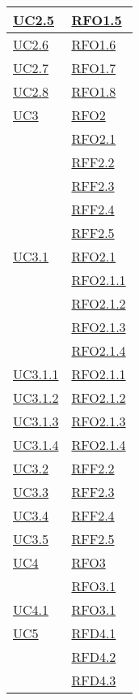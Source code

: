 \begin{longtable}{|>{\centering}m{5cm}|m{5cm}<{\centering}|}
\hyperref[UC2.5]{UC2.5} & \hyperlink{RFO1.5}{RFO1.5}\\ \hline
\hyperref[UC2.6]{UC2.6} & \hyperlink{RFO1.6}{RFO1.6}\\ \hline
\hyperref[UC2.7]{UC2.7} & \hyperlink{RFO1.7}{RFO1.7}\\ \hline
\hyperref[UC2.8]{UC2.8} & \hyperlink{RFO1.8}{RFO1.8}\\ \hline
\hyperref[UC3]{UC3} & \hyperlink{RFO2}{RFO2}\\
& \hyperlink{RFO2.1}{RFO2.1}\\
& \hyperlink{RFF2.2}{RFF2.2}\\
& \hyperlink{RFF2.3}{RFF2.3}\\
& \hyperlink{RFF2.4}{RFF2.4}\\
& \hyperlink{RFF2.5}{RFF2.5}\\ \hline
\hyperref[UC3.1]{UC3.1} & \hyperlink{RFO2.1}{RFO2.1}\\
& \hyperlink{RFO2.1.1}{RFO2.1.1}\\
& \hyperlink{RFO2.1.2}{RFO2.1.2}\\
& \hyperlink{RFO2.1.3}{RFO2.1.3}\\
& \hyperlink{RFO2.1.4}{RFO2.1.4}\\ \hline
\hyperref[UC3.1.1]{UC3.1.1} & \hyperlink{RFO2.1.1}{RFO2.1.1}\\ \hline
\hyperref[UC3.1.2]{UC3.1.2} & \hyperlink{RFO2.1.2}{RFO2.1.2}\\ \hline
\hyperref[UC3.1.3]{UC3.1.3} & \hyperlink{RFO2.1.3}{RFO2.1.3}\\ \hline
\hyperref[UC3.1.4]{UC3.1.4} & \hyperlink{RFO2.1.4}{RFO2.1.4}\\ \hline
\hyperref[UC3.2]{UC3.2} & \hyperlink{RFF2.2}{RFF2.2}\\ \hline
\hyperref[UC3.3]{UC3.3} & \hyperlink{RFF2.3}{RFF2.3}\\ \hline
\hyperref[UC3.4]{UC3.4} & \hyperlink{RFF2.4}{RFF2.4}\\ \hline
\hyperref[UC3.5]{UC3.5} & \hyperlink{RFF2.5}{RFF2.5}\\ \hline
\hyperref[UC4]{UC4} & \hyperlink{RFO3}{RFO3}\\
& \hyperlink{RFO3.1}{RFO3.1}\\ \hline
\hyperref[UC4.1]{UC4.1} & \hyperlink{RFO3.1}{RFO3.1}\\ \hline
\hyperref[UC5]{UC5} & \hyperlink{RFD4.1}{RFD4.1}\\
& \hyperlink{RFD4.2}{RFD4.2}\\
& \hyperlink{RFD4.3}{RFD4.3}\\

\end{longtable}
